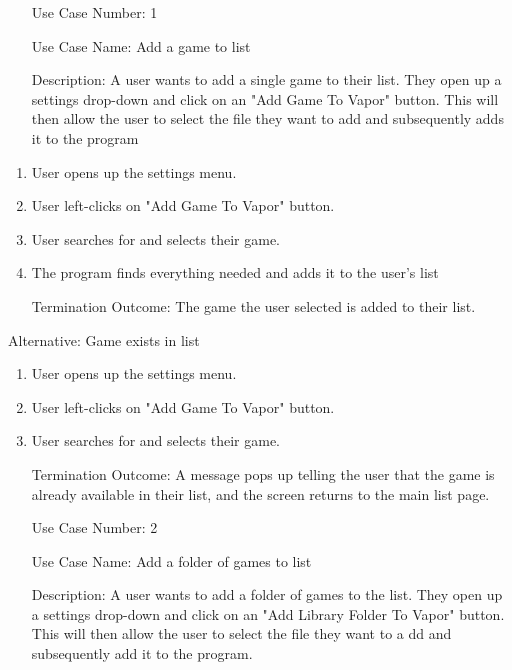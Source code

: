 \documentclass[10pt,conference,onecolumn,compsoc]{IEEEtran}
\begin{document}


\begin{itemize}
\item[Use Case Number:] 1
\item[Use Case Name:] Add a game to list
\item[Description:] A user wants to add a single game to their list. They open up a settings drop-down and click on an "Add Game To Vapor" button. This will then allow the user to select the file they want to add and subsequently adds it to the program
\end{itemize}
%
%
\begin{enumerate}
\item User opens up the settings menu.
\item User left-clicks on "Add Game To Vapor" button.
\item User searches for and selects their game.
\item The program finds everything needed and adds it to the user's list
\item[Termination Outcome:] The game the user selected is added to their list.
\end{enumerate}
%
%
Alternative: Game exists in list
\begin{enumerate}
\item User opens up the settings menu.
\item User left-clicks on "Add Game To Vapor" button.
\item User searches for and selects their game.
\item [Termination Outcome:] A message pops up telling the user that the game is already available in their list, and the screen returns to the main list page.
\end{enumerate}
%
%
%
\begin{itemize}
\item[Use Case Number:] 2
\item[Use Case Name:] Add a folder of games to list
\item[Description:] A user wants to add a folder of games to the list. They open up a settings drop-down and click on an "Add Library Folder To Vapor" button. This will then allow the user to select the file they want to a dd and subsequently add it to the program.
\end{itemize}
\end{document}

